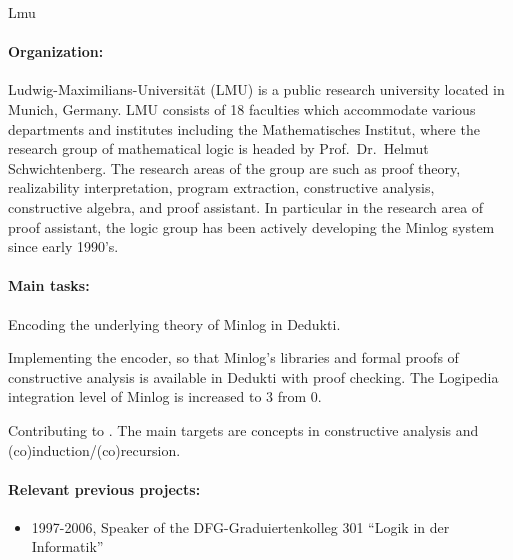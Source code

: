 \begin{sitedescription}{Lmu}

\newcommand{\inquotes}[1]{``#1''}
\paragraph{Organization:}

Ludwig-Maximilians-Universit\"at (LMU) is a public research university
located in Munich, Germany.  LMU consists of 18 faculties which
accommodate various departments and institutes including the
Mathematisches Institut, where the research group of mathematical
logic is headed by Prof.\ Dr.\ Helmut Schwichtenberg.  The research
areas of the group are such as proof theory, realizability
interpretation, program extraction, constructive analysis,
constructive algebra, and proof assistant.  In particular in the
research area of proof assistant, the logic group has been actively
developing the Minlog system since early 1990's.

\paragraph{Main tasks:}

\begin{compactitem}
  \item Encoding the underlying theory of Minlog in Dedukti.  
  \item Implementing the encoder, so that Minlog's libraries and formal proofs of constructive analysis is available in Dedukti with proof checking.
The Logipedia integration level of Minlog is increased to 3 from 0.  
  \item Contributing to .  The main targets are concepts in constructive analysis and (co)induction/(co)recursion.

\end{compactitem}

\paragraph{Relevant previous projects:}

\begin{itemize}
  \item 1997-2006, Speaker of the DFG-Graduiertenkolleg 301
    \inquotes{Logik in der Informatik}


\end{itemize}
\end{sitedescription}
